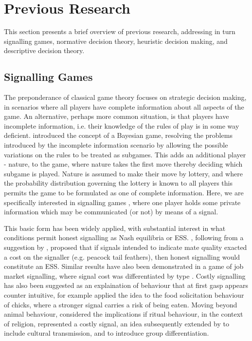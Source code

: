 \section{Previous Research}

\label{sec:lit_review}

This section presents a brief overview of previous research, addressing in turn signalling games, normative decision theory, heuristic decision making, and descriptive decision theory.


\subsection{Signalling Games}

The preponderance of classical game theory focuses on strategic decision making, in scenarios where all players have complete information about all aspects of the game. An alternative, perhaps more common situation, is that players have incomplete information, i.e. their knowledge of the rules of play is in some way deficient. \citet{Harsanyi1967} introduced the concept of a Bayesian game, resolving the problems introduced by the incomplete information scenario by allowing the possible variations on the rules to be treated as subgames. This adds an additional player - nature, to the game, where nature takes the first move thereby deciding which subgame is played. Nature is assumed to make their move by lottery, and where the probability distribution governing the lottery is known to all players this permits the game to be formulated as one of complete information. Here, we are specifically interested in signalling games \citep{Kreps1987,Spence1973}, where one player holds some private information which may be communicated (or not) by means of a signal.

This basic form has been widely applied, with substantial interest in what conditions permit honest signalling as Nash equilibria or \ac{ESS}. \citet{Grafen1990}, following from a suggestion by \citet{Zahavi1975}, proposed that if signals intended to indicate mate quality exacted a cost on the signaller (e.g. peacock tail feathers), then honest signalling would constitute an \ac{ESS}. Similar results have also been demonstrated in a game of job market signalling, where signal cost was differentiated by type \citep{Spence1973}. 
Costly signalling has also been suggested as an explaination of behaviour that at first gasp appears counter intuitive, for example \citet{Godfray1991} applied the idea to the food solicitation behaviour of chicks, where a stronger signal carries a risk of being eaten. Moving beyond animal behaviour, \citet{Sosis2003} considered the implications if ritual behaviour, in the context of religion, represented a costly signal, an idea subsequently extended by \citet{Henrich2009} to include cultural transmission, and \citet{Wildman2011} to introduce group differentiation.

